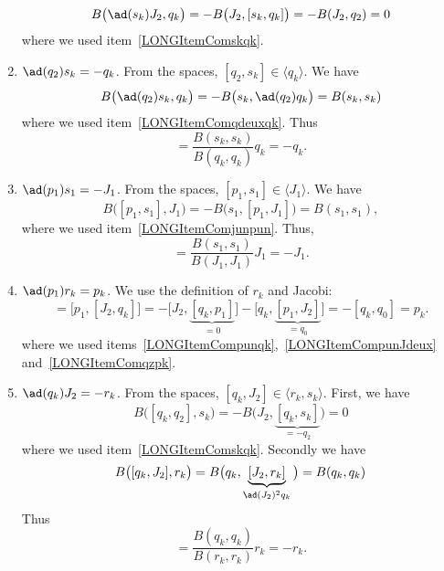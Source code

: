 \begin{enumerate}
		\begin{equation}
			B\big( \ad(s_k)J_2,q_k \big)=-B\big( J_2,[s_k,q_k] \big)=-B(J_2,q_2)=0
		\end{equation}
		where we used item~\ref{LONGItemComskqk}.
	\item$\ad(q_2)s_k=-q_k$. From the spaces, $[q_2,s_k]\in\langle q_k\rangle$. We have
		\begin{equation}
			B\big( \ad(q_2)s_k,q_k \big)=-B\big( s_k,\ad(q_2)q_k \big)=B(s_k,s_k)
		\end{equation}
		where we used item~\ref{LONGItemComqdeuxqk}. Thus
		\begin{equation}
			[q_2,s_k]=\frac{ B(s_k,s_k) }{ B(q_k,q_k) }q_k=-q_k.
		\end{equation}
	\item$\ad(p_1)s_1=-J_1$. From the spaces, $[p_1,s_1]\in\langle J_1\rangle$. We have
		\begin{equation}
			B\big( [p_1,s_1],J_1 \big)=-B\big( s_1,[p_1,J_1] \big)=B(s_1,s_1),
		\end{equation}
		where we used item~\ref{LONGItemComjunpun}. Thus,
		\begin{equation}
			[p_1,s_1]=\frac{ B(s_1,s_1) }{ B(J_1,J_1) }J_1=-J_1.
		\end{equation}
	\item$\ad(p_1)r_k=p_k$\label{LONGItemCompunrk}. We use the definition of $r_k$ and Jacobi:
		\begin{equation}
			[p_1,r_k]=\big[ p_1,[J_2,q_k] \big]=-\big[ J_2,\underbrace{[q_k,p_1]}_{=0} \big]-\big[ q_k,\underbrace{[p_1,J_2]}_{=q_0} \big]=-[q_k,q_0]=p_k.
		\end{equation}
		where we used items~\ref{LONGItemCompunqk},~\ref{LONGItemCompunJdeux} and~\ref{LONGItemComqzpk}.
	\item$\ad(q_k)J_2=-r_k$\label{LONGItemComkJdeux}. From the spaces, $[q_k,J_2]\in\langle r_k,s_k\rangle$. First, we have
		\begin{equation}
			B\big( [q_k,q_2],s_k \big)=-B\big( J_2,\underbrace{[q_k,s_k]}_{=-q_2} \big)=0
		\end{equation}
		where we used item~\ref{LONGItemComskqk}. Secondly we have
		\begin{equation}
			B\big( [q_k,J_2],r_k \big)=B\big( q_k,\underbrace{[J_2,r_k]}_{\ad(J_2)^2q_k} \big)=B(q_k,q_k)
		\end{equation}
		Thus
		\begin{equation}
			[q_k,J_2]=\frac{ B(q_k,q_k) }{ B(r_k,r_k) }r_k=-r_k.
		\end{equation}

\end{enumerate}
